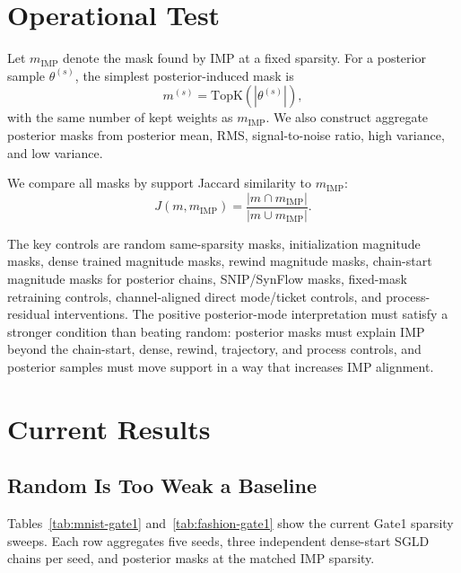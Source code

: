 \documentclass{article}
\begin{document}
\section{Operational Test}

Let $m_{\mathrm{IMP}}$ denote the mask found by IMP at a fixed sparsity. For a
posterior sample $\theta^{(s)}$, the simplest posterior-induced mask is
\[
  m^{(s)} = \mathrm{TopK}(|\theta^{(s)}|),
\]
with the same number of kept weights as $m_{\mathrm{IMP}}$. We also construct
aggregate posterior masks from posterior mean, RMS, signal-to-noise ratio, high
variance, and low variance.

We compare all masks by support Jaccard similarity to $m_{\mathrm{IMP}}$:
\[
  J(m, m_{\mathrm{IMP}}) =
  \frac{|m \cap m_{\mathrm{IMP}}|}{|m \cup m_{\mathrm{IMP}}|}.
\]

The key controls are random same-sparsity masks, initialization magnitude
masks, dense trained magnitude masks, rewind magnitude masks, chain-start
magnitude masks for posterior chains, SNIP/SynFlow masks, fixed-mask retraining
controls, channel-aligned direct mode/ticket controls, and process-residual
interventions. The positive posterior-mode interpretation must satisfy a
stronger condition than beating random: posterior masks must explain IMP beyond
the chain-start, dense, rewind, trajectory, and process controls, and posterior
samples must move support in a way that increases IMP alignment.

\section{Current Results}

\subsection{Random Is Too Weak a Baseline}

Tables~\ref{tab:mnist-gate1} and~\ref{tab:fashion-gate1} show the current
Gate1 sparsity sweeps. Each row aggregates five seeds, three independent
dense-start SGLD chains per seed, and posterior masks at the matched IMP
sparsity.
\end{document}
